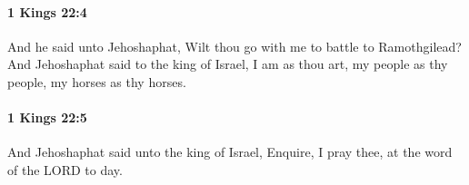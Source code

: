 		\paragraph{1 Kings 22:4} %
			\label{1KINGS-22-4}

			And he said unto Jehoshaphat, Wilt thou go with me to battle to Ramothgilead? And Jehoshaphat said to the king of Israel, I am as thou art, my people as thy people, my horses as thy horses.


		\paragraph{1 Kings 22:5} %
			\label{1KINGS-22-5}

			And Jehoshaphat said unto the king of Israel, Enquire, I pray thee, at the word of the LORD to day.


